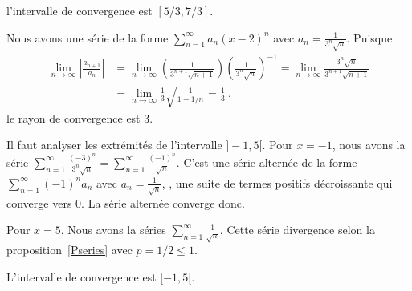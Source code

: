 {l'intervalle de convergence est $[5/3, 7/3]$.

 Nous avons une série de la forme
$\displaystyle \sum_{n=1}^\infty a_n (x-2)^n$ avec
$\displaystyle a_n = \frac{1}{3^n\sqrt{n}}$.  Puisque
\begin{align*}
\lim_{n\to \infty} \left|\frac{a_{n+1}}{a_n}\right|
&= \lim_{n\to \infty} \left( \frac{1}{3^{n+1}\sqrt{n+1}}\right)
\left( \frac{1}{3^n\sqrt{n}}\right)^{-1}
= \lim_{n\to \infty} \frac{3^n\sqrt{n}}{3^{n+1}\sqrt{n+1}} \\
&= \lim_{n\to \infty} \frac{1}{3} \sqrt{\frac{1}{1+ 1/n}}
= \frac{1}{3} \ ,
\end{align*}
le rayon de convergence est $3$.

Il faut analyser les extrémités de l'intervalle
$]-1, 5[$.  Pour $x=-1$, nous avons la série
$\displaystyle \sum_{n=1}^\infty \frac{(-3)^n}{3^n\sqrt{n}}
= \sum_{n=1}^\infty \frac{(-1)^n}{\sqrt{n}}$.
C'est une série alternée de la forme
$\displaystyle \sum_{n=1}^\infty (-1)^n a_n$ avec 
$\displaystyle a_n = \frac{1}{\sqrt{n}}$, , une suite de termes
positifs décroissante qui converge vers $0$.  La
série alternée converge donc.

Pour $x=5$, Nous avons la séries
$\displaystyle \sum_{n=1}^\infty \frac{1}{\sqrt{n}}$.
Cette série divergence selon la proposition~\ref{Pseries} avec
$p = 1/2 \leq 1$.

L'intervalle de convergence est $[-1, 5[$.
}


